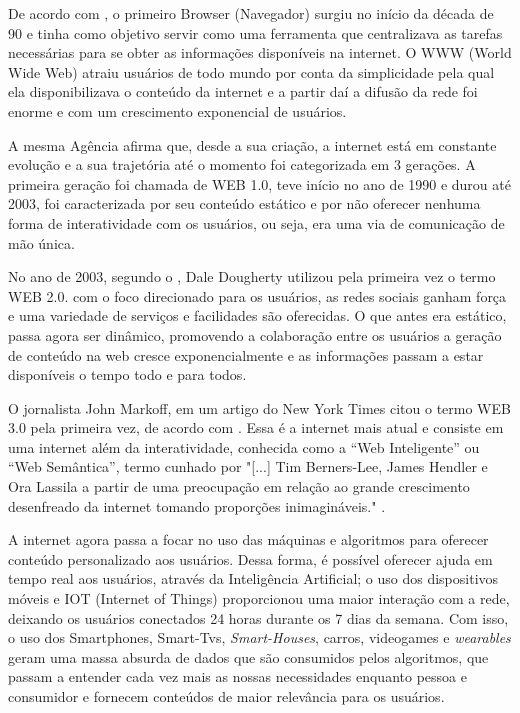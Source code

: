 \documentclass[12pt]{article}
\begin{document}
De acordo com , o primeiro Browser (Navegador) surgiu no início da década de 90 e tinha como objetivo servir como uma ferramenta que centralizava as tarefas necessárias para se obter as informações disponíveis na internet. O WWW (World Wide Web) atraiu usuários de todo mundo por conta da simplicidade pela qual ela disponibilizava o conteúdo da internet e a partir daí a difusão da rede foi enorme e com um crescimento exponencial de usuários.

A mesma Agência afirma que, desde a sua criação, a internet está em constante evolução e a sua trajetória até o momento foi categorizada em 3 gerações. A primeira geração foi chamada de WEB 1.0, teve início no ano de 1990 e durou até 2003, foi caracterizada por seu conteúdo estático e por não oferecer nenhuma forma de interatividade com os usuários, ou seja, era uma via de comunicação de mão única. 

No ano de 2003, segundo o ,  Dale Dougherty utilizou pela primeira vez o termo WEB 2.0. com o foco direcionado para os usuários, as redes sociais ganham força e uma variedade de serviços e facilidades são oferecidas.  O que antes era estático, passa agora ser dinâmico, promovendo a colaboração entre os usuários a geração de conteúdo na web cresce exponencialmente e as informações passam a estar disponíveis o tempo todo e para todos. 

O jornalista John Markoff, em um artigo do New York Times citou o termo WEB 3.0 pela primeira vez, de acordo com . Essa é a internet mais atual e consiste em uma internet além da interatividade, conhecida como a “Web Inteligente” ou “Web Semântica”, termo cunhado por "[...] Tim Berners-Lee, James Hendler e Ora Lassila a partir de uma preocupação em relação ao grande crescimento desenfreado da internet tomando proporções inimagináveis."  \cite{becker_o_2019}.

A internet agora passa a focar no uso das máquinas e algoritmos para oferecer conteúdo personalizado aos usuários. Dessa forma, é possível oferecer ajuda em tempo real aos usuários, através da Inteligência Artificial; o uso dos dispositivos móveis e IOT (Internet of Things) proporcionou uma maior interação com a rede, deixando os usuários conectados 24 horas  durante os 7 dias da semana. Com isso, o uso dos Smartphones, Smart-Tvs,\textit{ Smart-Houses}, carros, videogames e \textit{wearables} geram uma massa absurda de dados que são consumidos pelos algoritmos, que passam a entender cada vez mais as nossas necessidades enquanto pessoa e consumidor e fornecem conteúdos de maior relevância para os usuários. 
\end{document}
